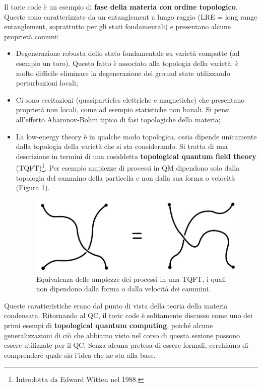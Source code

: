 \noindent Il toric code è un esempio di \textbf{fase della materia con ordine topologico}. Queste sono caratterizzate da un entanglement a lungo raggio (LRE = long range entanglement, soprattutto per gli stati fondamentali) e presentano alcune proprietà comuni:
\begin{itemize}
    \item Degenerazione robusta dello stato fondamentale su varietà compatte (ad esempio un toro). Questo fatto è associato alla topologia della varietà: è molto difficile eliminare la degenerazione del ground state utilizzando perturbazioni locali;
    \item Ci sono eccitazioni  (quasiparticles elettriche e magnetiche) che presentano proprietà non locali, come ad esempio statistiche non banali. Si pensi all'effetto Aharonov-Bohm tipico di fasi topologiche della materia;
    \item La low-energy theory è in qualche modo topologica, ossia dipende unicamente dalla topologia della varietà che si sta considerando. Si tratta di una descrizione in termini di una cosiddetta \textbf{topological quantum field theory} (TQFT)\footnote{Introdotta da Edward Witten nel 1988.}. Per esempio ampiezze di processi in QM dipendono solo dalla topologia del cammino della particella e non dalla sua forma o velocità (Figura \ref{fig:qtft-equiv}).
    \begin{figure}[H]
        \centering
        \includegraphics[scale=0.4]{images/qtft-equiv.jpg}
        \caption{Equivalenza delle ampiezze dei processi in una TQFT, i quali non dipendono dalla forma o dalla velocità dei cammini.}
        \label{fig:qtft-equiv}
    \end{figure}
\end{itemize}

\noindent Queste caratteristiche erano dal punto di vista della teoria della materia condensata. Ritornando al QC, il toric code è solitamente discusso come uno dei primi esempi di \textbf{topological quantum computing}, poiché alcune generalizzazioni di ciò che abbiamo visto nel corso di questa sezione possono essere utilizzate per il QC. Senza alcuna pretesa di essere formali, cerchiamo di comprendere quale sia l'idea che ne sta alla base. 

